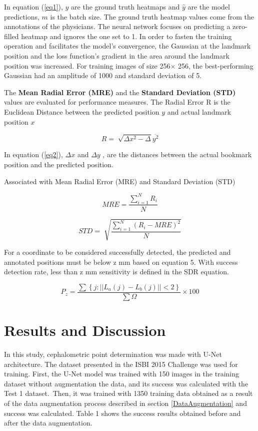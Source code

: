 \documentclass{elektr}
\begin{document}
In equation (\ref{eq1}), \( y \) are the ground truth heatmaps and  \( \hat{y} \)  are the model predictions,  \( m \)  is the batch size. The ground truth heatmap values come from the annotations of the physicians. The neural network focuses on predicting a zero-filled heatmap and ignores the one set to 1. In order to fasten the training operation and facilitates the model’s convergence, the Gaussian at the landmark position and the loss function’s gradient in the area around the landmark position was increased. For training images of size 256$ \times $ 256, the best-performing Gaussian had an amplitude of 1000 and standard deviation of 5. 


The \textbf{Mean Radial Error (MRE)} and the \textbf{Standard Deviation (STD)} values are evaluated for performance measures. The Radial Error R is the Euclidean Distance between the predicted position  \( y \)  and actual landmark position  \( x \) 


\begin{equation}
	\label{eq2}
	R=\sqrt[]{ \Delta x^{2}- \Delta }\overline{y^{2}}
\end{equation}

\tab In equation (\ref{eq2}), \(  \Delta x \)  and  \(  \Delta y \) , are the distances between the actual bookmark position and the predicted position. 


\tab Associated with Mean Radial Error (MRE) and Standard Deviation (STD)

\begin{equation}
	\label{eq3}
	MRE=\frac{ \sum _{i=1}^{N}R_{i}}{N}
\end{equation}

\begin{equation}
	\label{eq4}
	STD=\sqrt[]{\frac{ \sum _{i=1}^{N} \left( R_{i}-MRE \right) ^{2}}{N}}
\end{equation}

\tab For a coordinate to be considered successfully detected, the predicted and annotated positions must be below z mm based on equation 5. With success detection rate, less than z mm sensitivity is defined in the SDR equation.

\begin{equation}
	\label{eq5}
	 P_{z}=\frac{\sum \left \{ j:||L_{a}(j) - L_{b}(j)|| <2 \right \}}{\sum \Omega} \times 100
\end{equation}


\section{Results and Discussion}
\tab In this study, cephalometric point determination was made with U-Net architecture.  The dataset presented in the ISBI 2015 Challenge was used for training. First, the U-Net model was trained with 150 images in the training dataset without augmentation the data, and its success was calculated with the Test 1 dataset.\  Then, it was trained with 1350 training data obtained as a result of the data augmentation process described in section \ref{DataAugmentation} and success was calculated. Table 1 shows the success results obtained before and after the data augmentation.
\end{document}
